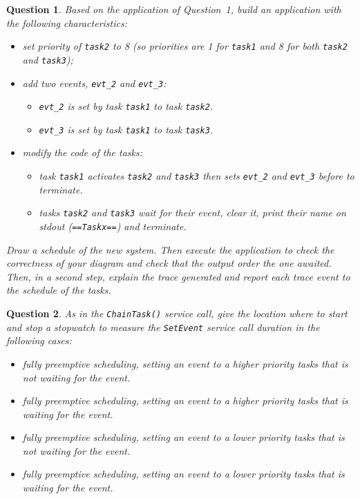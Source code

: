 \documentclass[11pt]{report}
\newtheorem{ex}{Question}
\begin{document}
\begin{ex}
  Based on the application of Question~1, build an application with the following characteristics:
  \begin{itemize}
    \item set priority of \texttt{task2} to 8 (so priorities are 1 for \texttt{task1} and 8 for both \texttt{task2} and \texttt{task3});
    \item add two events, \texttt{evt\_2} and \texttt{evt\_3}:
      \begin{itemize}
        \item \texttt{evt\_2} is set by task \texttt{task1} to task \texttt{task2}.
        \item \texttt{evt\_3} is set by task \texttt{task1} to task \texttt{task3}.
      \end{itemize}
    \item modify the code of the tasks:
      \begin{itemize}
        \item task \texttt{task1} activates \texttt{task2} and \texttt{task3} then sets \texttt{evt\_2} and \texttt{evt\_3} before to terminate.
        \item tasks \texttt{task2} and \texttt{task3} wait for their event, clear it, print their name on stdout (\texttt{==Taskx==}) and terminate.
      \end{itemize}
  \end{itemize}

  Draw a schedule of the new system.
  Then execute the application to check the correctness of your diagram and check that the output order the one awaited. Then, in a second step, explain the trace generated and report each trace event to the schedule of the tasks.

\end{ex}

\begin{ex}
  As in the \lstinline{ChainTask()} service call, give the location where to start and stop a stopwatch to measure the \texttt{SetEvent} service call duration in the following cases:
  \begin{itemize}
    \item fully preemptive scheduling, setting an event to a higher priority tasks that is not waiting for the event.
    \item fully preemptive scheduling, setting an event to a higher priority tasks that is waiting for the event.
    \item fully preemptive scheduling, setting an event to a lower priority tasks that is not waiting for the event.
    \item fully preemptive scheduling, setting an event to a lower priority tasks that is waiting for the event.
  \end{itemize}

\end{ex}
\end{document}
